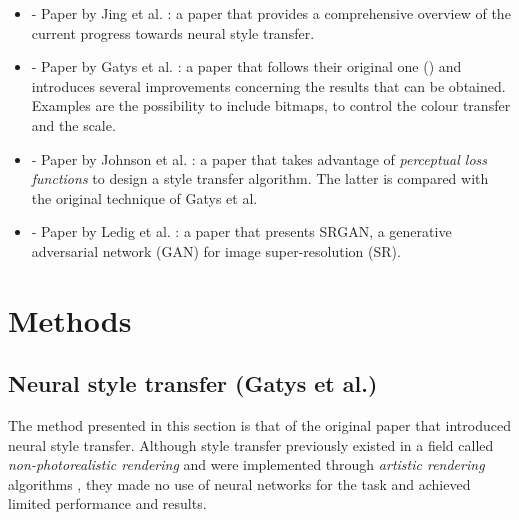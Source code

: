 \documentclass[twocolumn,superscriptaddress,aps, floatfix]{revtex4-1}
\begin{document}
    \begin{itemize}
        \item \cite{DBLP:journals/corr/JingYFYS17} - Paper by Jing et al. :  a paper that provides a comprehensive overview of the current progress towards neural style transfer.
        \item \cite{DBLP:journals/corr/GatysEBHS16} - Paper by Gatys et al. : a paper that follows their original one (\cite{DBLP:journals/corr/GatysEB15a}) and introduces several improvements concerning the results that can be obtained. Examples are the possibility to include bitmaps, to control the colour transfer and the scale.
        \item \cite{DBLP:journals/corr/JohnsonAL16} - Paper by Johnson et al. : a paper that takes advantage of \emph{perceptual loss functions} to design a style transfer algorithm. The latter is compared with the original technique of Gatys et al.
        \item \cite{DBLP:journals/corr/LedigTHCATTWS16} - Paper by Ledig et al. : a paper that presents SRGAN, a generative adversarial network (GAN) for image super-resolution (SR).
    \end{itemize}
    
    
    
    
    \section{Methods}
    
    \subsection{Neural style transfer (Gatys et al.)}\label{methods.gatys}
    
    The method presented in this section is that of the original paper that introduced neural style transfer. Although style transfer previously existed in a field called \emph{non-photorealistic rendering} and were implemented through \emph{artistic rendering} algorithms \cite{DBLP:journals/corr/JingYFYS17}, they made no use of neural networks for the task and achieved limited performance and results.\\
    
\end{document}
